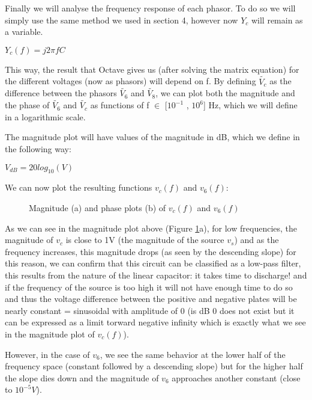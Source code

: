 \hspace{12pt} Finally we will analyse the frequency response of each phasor. To do so we will simply use the same method we used in section 4, however now $Y_c$ will remain as a variable.

$Y_c(f)=j2\pi fC$

This way, the result that Octave gives us (after solving the matrix equation) for the different voltages (now as phasors) will depend on f.
By defining $\widetilde{V_c}$ as the difference between the phasors $\widetilde{V_6}$ and $\widetilde{V_8}$, we can plot both the magnitude and the phase of $\widetilde{V_6}$ and $\widetilde{V_c}$ as functions of f $\in$ [$10^{-1}$ , $10^6$] Hz, which we will define in a logarithmic scale.

\vspace{20pt}

The magnitude plot will have values of the magnitude in dB, which we define in the following way:

\vspace{20pt}

$V_{dB} = 20log_{10}(V)$

\vspace{20pt}

We can now plot the resulting functions $v_c(f)$ and $v_6(f)$:


\begin{figure}[h!]
	\centering
	\caption{Magnitude (a) and phase plots (b) of $v_c(f)$ and $v_6(f)$}
	\label{fig:theory_fr}
\end{figure}

As we can see in the magnitude plot above (Figure \ref{fig:theory_fr}a), for low frequencies, the magnitude of $v_c$ is close to 1V (the magnitude of the source $v_s$) and as the frequency increases, this magnitude drops (as seen by the descending slope) for this reason, we can confirm that this circuit can be classified as a low-pass filter, this results from the nature of the linear capacitor: it takes time to discharge! and if the frequency of the source is too high it will not have enough time to do so and thus the voltage difference between the positive and negative plates will be nearly constant = sinusoidal with amplitude of 0 (is dB 0 does not exist but it can be expressed as a limit torward negative infinity which is exactly what we see in the magnitude plot of $v_c(f)$). 

However, in the case of $v_6$, we see the same behavior at the lower half of the frequency space (constant followed by a descending slope) but for the higher half the slope dies down and the magnitude of $v_6$ approaches another constant (close to $10^{-5}V$).



\newpage
